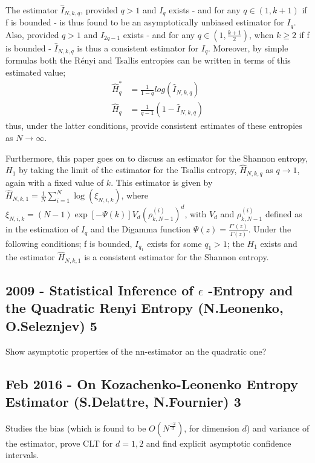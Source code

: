 \documentclass{article}
\begin{document}
The estimator $\hat{I}_{N, k, q}$, provided $q>1$ and $I_{q}$ exists - and for any $q \in (1, k+1)$ if f is bounded - is thus found to be an asymptotically unbiased estimator for $I_{q}$. Also, provided  $q>1$ and $I_{2q-1}$ exists -  and for any $q \in (1, \frac{k+1}{2})$, when $k \geq 2$ if f is bounded - $\hat{I}_{N, k, q}$ is thus a consistent estimator for $I_{q}$. Moreover, by simple formulas both the R\'enyi and Tsallis entropies can be written in terms of this estimated value; 
\begin{align}
\hat{H}_{q}^{*} &= \frac{1}{1-q} log(\hat{I}_{N, k, q}) \\
\hat{H}_{q} &= \frac{1}{q-1} (1 - \hat{I}_{N, k, q})
\end{align}
thus, under the latter conditions, provide consistent estimates of these entropies as $N \to \infty$.

Furthermore, this paper goes on to discuss an estimator for the Shannon entropy, $H_{1}$ by taking the limit of the estimator for the Tsallis entropy, $\hat{H}_{N, k, q}$ as $q \to 1$, again with a fixed value of $k$. This estimator is given by $\hat{H}_{N, k, 1} =  \frac{1}{N} \sum_{i=1}^{N} \log (\xi_{N, i, k})$, where $\xi_{N, i, k} = (N-1)\exp[-\Psi(k)]V_{d}(\rho_{k, N-1}^{(i)})^{d}$, with $V_{d}$ and $\rho_{k, N-1}^{(i)}$ defined as in the estimation of $I_{q}$ and the Digamma function $\Psi(z) = \frac{\Gamma'(z)}{\Gamma(z)}$. Under the following conditions; f is bounded, $I_{q_{1}}$ exists for some $q_{1} > 1$; the $H_{1}$ exists and the estimator $\hat{H}_{N, k, 1}$ is a consistent estimator for the Shannon entropy.




\subsection{2009 - Statistical Inference of $\epsilon$ -Entropy and the Quadratic Renyi Entropy (N.Leonenko, O.Seleznjev) 5}

Show asymptotic properties of the nn-estimator an the quadratic one?



\subsection{Feb 2016 - On Kozachenko-Leonenko Entropy Estimator (S.Delattre, N.Fournier) 3}

Studies the bias (which is found to be $O(N^{\frac{-2}{d}})$, for dimension $d$) and variance of the estimator, prove CLT for $d=1,2$ and find explicit asymptotic confidence intervals.
\end{document}
